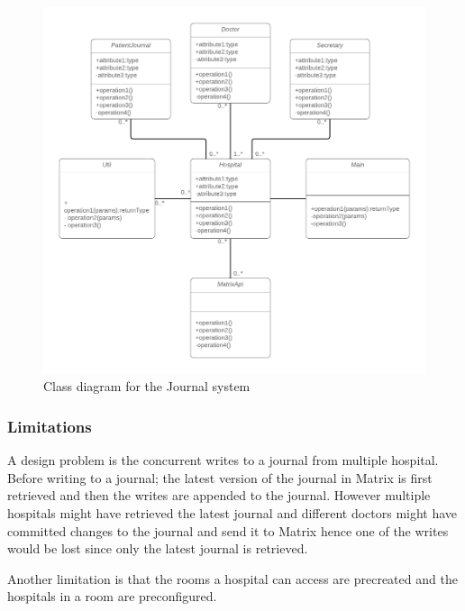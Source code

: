 \begin{figure}[H] 
	\hspace*{-1.3cm}
	\centering
	\includegraphics[width=14cm]{figures/journalsystem_class.png}
	\caption{Class diagram for the Journal system}
	\label{fig:journalsystem}
\end{figure}





\subsubsection{Limitations}



A design problem is the concurrent writes to a journal from multiple hospital. Before writing to a journal; the latest version of the journal in Matrix is first retrieved and then the writes are appended to the journal. However multiple hospitals might have retrieved the latest journal and different doctors might have committed changes to the journal and send it to Matrix hence one of the writes would be lost since only the latest journal is retrieved. 

Another limitation is that the rooms a hospital can access are precreated and the hospitals in a room are preconfigured. 



